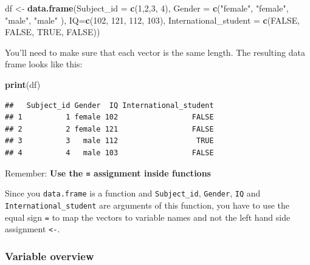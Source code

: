 \documentclass[
]{scrartcl}
\makeatletter
\newenvironment{Shaded}{\begin{snugshade}}{\end{snugshade}}
\newcommand{\AttributeTok}[1]{\textcolor[rgb]{0.13,0.29,0.53}{#1}}
\newcommand{\ConstantTok}[1]{\textcolor[rgb]{0.56,0.35,0.01}{#1}}
\newcommand{\DecValTok}[1]{\textcolor[rgb]{0.00,0.00,0.81}{#1}}
\newcommand{\FunctionTok}[1]{\textcolor[rgb]{0.13,0.29,0.53}{\textbf{#1}}}
\newcommand{\NormalTok}[1]{#1}
\newcommand{\OtherTok}[1]{\textcolor[rgb]{0.56,0.35,0.01}{#1}}
\newcommand{\StringTok}[1]{\textcolor[rgb]{0.31,0.60,0.02}{#1}}
\newenvironment{kframe}{%
\medskip{}
\setlength{\fboxsep}{.8em}
 \def\at@end@of@kframe{}%
 \ifinner\ifhmode%
  \def\at@end@of@kframe{\end{minipage}}%
  \begin{minipage}{\columnwidth}%
 \fi\fi%
 \def\FrameCommand##1{\hskip\@totalleftmargin \hskip-\fboxsep
 \colorbox{shadecolor}{##1}\hskip-\fboxsep
     \hskip-\linewidth \hskip-\@totalleftmargin \hskip\columnwidth}%
 \MakeFramed {\advance\hsize-\width
   \@totalleftmargin\z@ \linewidth\hsize
   \@setminipage}}%
 {\par\unskip\endMakeFramed%
 \at@end@of@kframe}
\newenvironment{rmdblock}[1]
  {
  \begin{itemize}
  \renewcommand{\labelitemi}{
    \raisebox{-.7\height}[0pt][0pt]{
      {\setkeys{Gin}{width=3em,keepaspectratio}\texttt{[image: images/\#1]}}
    }
  }
  \setlength{\fboxsep}{1em}
  \begin{kframe}
  \item
  }
  {
  \end{kframe}
  \end{itemize}
  }
\newenvironment{important}
    {\begin{rmdblock}{hint}}
    {\end{rmdblock}}
\makeatother
\begin{document}
\begin{Shaded}
\begin{Highlighting}[]
\NormalTok{df }\OtherTok{\textless{}{-}} \FunctionTok{data.frame}\NormalTok{(}\AttributeTok{Subject\_id =} \FunctionTok{c}\NormalTok{(}\DecValTok{1}\NormalTok{,}\DecValTok{2}\NormalTok{,}\DecValTok{3}\NormalTok{, }\DecValTok{4}\NormalTok{),}
                 \AttributeTok{Gender =} \FunctionTok{c}\NormalTok{(}\StringTok{"female"}\NormalTok{, }\StringTok{"female"}\NormalTok{, }\StringTok{"male"}\NormalTok{, }\StringTok{"male"}\NormalTok{ ),}
                 \AttributeTok{IQ=}\FunctionTok{c}\NormalTok{(}\DecValTok{102}\NormalTok{, }\DecValTok{121}\NormalTok{, }\DecValTok{112}\NormalTok{, }\DecValTok{103}\NormalTok{),}
                 \AttributeTok{International\_student =} \FunctionTok{c}\NormalTok{(}\ConstantTok{FALSE}\NormalTok{, }\ConstantTok{FALSE}\NormalTok{, }\ConstantTok{TRUE}\NormalTok{, }\ConstantTok{FALSE}\NormalTok{))}
\end{Highlighting}
\end{Shaded}

You'll need to make sure that each vector is the same length. The resulting data frame looks like this:

\begin{Shaded}
\begin{Highlighting}[]
\FunctionTok{print}\NormalTok{(df)}
\end{Highlighting}
\end{Shaded}

\begin{verbatim}
##   Subject_id Gender  IQ International_student
## 1          1 female 102                 FALSE
## 2          2 female 121                 FALSE
## 3          3   male 112                  TRUE
## 4          4   male 103                 FALSE
\end{verbatim}

\begin{important}
Remember: \textbf{Use the \texttt{=} assignment inside functions}

Since you \texttt{data.frame} is a function and \texttt{Subject\_id},
\texttt{Gender}, \texttt{IQ} and \texttt{International\_student} are
arguments of this function, you have to use the equal sign \texttt{=} to
map the vectors to variable names and not the left hand side assignment
\texttt{\textless{}-}.
\end{important}

\subsubsection*{Variable overview}\label{variable-overview}
\end{document}
